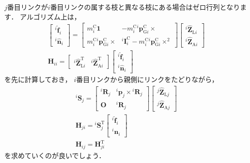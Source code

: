 \documentclass{jsarticle}
\begin{document}
$j$番目リンクが$i$番目リンクの属する枝と異なる枝にある場合はゼロ行列となります．
アルゴリズム上は，
\begin{align*}
\left[\begin{array}{c}
{}^{i}\hat{\bm{f}}_{i}
\\
{}^{i}\hat{\bm{n}}_{i}
\end{array}\right]
=
\left[\begin{array}{cc}
m_{i}^{\mathrm{C}}\bm{1} & -m_{i}^{\mathrm{C}}{}^{i}\bm{p}_{\mathrm{G}i}^{\mathrm{C}}\times \\
m_{i}^{\mathrm{C}}{}^{i}\bm{p}_{\mathrm{G}i}^{\mathrm{C}}\times & {}^{i}\bm{I}_{i}^{\mathrm{C}}-m_{i}^{\mathrm{C}}{}^{i}\bm{p}_{\mathrm{G}i}^{\mathrm{C}}\times^{2}
\end{array}\right]
\left[\begin{array}{c}
{}^{i}\hat{\bm{Z}}_{\mathrm{L}i}
\\
{}^{i}\hat{\bm{Z}}_{\mathrm{A}i}
\end{array}\right]
\\
\bm{H}_{ii}=
\left[\begin{array}{cc}
{}^{i}\hat{\bm{Z}}_{\mathrm{L}i}^{\mathrm{T}} &
{}^{i}\hat{\bm{Z}}_{\mathrm{A}i}^{\mathrm{T}}
\end{array}\right]
\left[\begin{array}{c}
{}^{i}\hat{\bm{f}}_{i}
\\
{}^{i}\hat{\bm{n}}_{i}
\end{array}\right]
\end{align*}
を先に計算しておき，
$i$番目リンクから親側にリンクをたどりながら，
\begin{align*}
{}^{i}\bm{S}_{j}=
\left[\begin{array}{cc}
{}^{i}\bm{R}_{j} & {}^{i}\bm{p}_{j}\times{}^{i}\bm{R}_{j}
\\
\bm{O} & {}^{i}\bm{R}_{j}
\end{array}\right]
\left[\begin{array}{c}
{}^{j}\hat{\bm{Z}}_{\mathrm{L}j}
\\
{}^{j}\hat{\bm{Z}}_{\mathrm{A}j}
\end{array}\right]
\\
\bm{H}_{ji}=
{}^{i}\bm{S}_{j}^{\mathrm{T}}
\left[\begin{array}{c}
{}^{i}\hat{\bm{f}}_{i}
\\
{}^{i}\hat{\bm{n}}_{i}
\end{array}\right]
\\
\bm{H}_{ij}=\bm{H}_{ji}^{\mathrm{T}}
\end{align*}
を求めていくのが良いでしょう．
\end{document}
